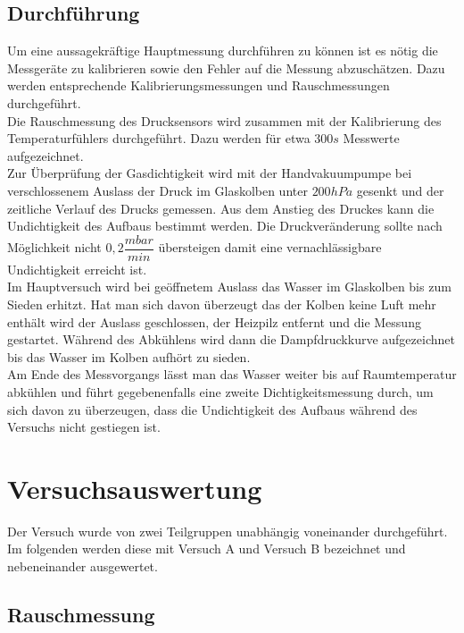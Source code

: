 \documentclass[12pt,a4paper]{article}
\begin{document}
\subsection{Durchführung}

Um eine aussagekräftige Hauptmessung durchführen zu können ist es nötig die Messgeräte zu kalibrieren sowie den Fehler auf die Messung abzuschätzen. Dazu werden entsprechende Kalibrierungsmessungen und Rauschmessungen durchgeführt.\\

Die Rauschmessung des Drucksensors wird zusammen mit der Kalibrierung des Temperaturfühlers durchgeführt. Dazu werden für etwa $300s$ Messwerte aufgezeichnet.\\
Zur Überprüfung der Gasdichtigkeit wird mit der Handvakuumpumpe bei verschlossenem Auslass der Druck im Glaskolben unter $200hPa$ gesenkt und der zeitliche Verlauf des Drucks gemessen. Aus dem Anstieg des Druckes kann die Undichtigkeit des Aufbaus bestimmt werden. Die Druckveränderung sollte nach Möglichkeit nicht $0,2 \dfrac{mbar}{min}$ übersteigen damit eine vernachlässigbare Undichtigkeit erreicht ist. \\

Im Hauptversuch wird bei geöffnetem Auslass das Wasser im Glaskolben bis zum Sieden erhitzt. Hat man sich davon überzeugt das der Kolben keine Luft mehr enthält wird der Auslass geschlossen, der Heizpilz entfernt und die Messung gestartet. Während des Abkühlens wird dann die Dampfdruckkurve aufgezeichnet bis das Wasser im Kolben aufhört zu sieden.\\
Am Ende des Messvorgangs lässt man das Wasser weiter bis auf Raumtemperatur abkühlen und führt gegebenenfalls eine zweite Dichtigkeitsmessung durch, um sich davon zu überzeugen, dass die Undichtigkeit des Aufbaus während des Versuchs nicht gestiegen ist. 

\section{Versuchsauswertung}
Der Versuch wurde von zwei Teilgruppen unabhängig voneinander durchgeführt. Im folgenden werden diese mit \glqq Versuch A \grqq und \glqq Versuch B \grqq bezeichnet und nebeneinander ausgewertet.



\subsection{Rauschmessung}
\end{document}
